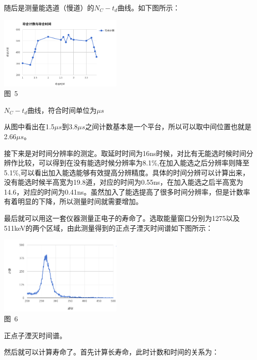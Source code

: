 \documentclass[a4paper,10.0pt,twoside]{npr}
\begin{document}
\begin{multicols}{2}
随后是测量能选道（慢道）的$N_C-t_d$曲线。如下图所示：

\begin{center}
   \includegraphics[width=0.45\textwidth]{5.png}
\\
\xiaowu\song 图~5\begin{minipage}[t]{75mm} \quad $N_C-t_d$曲线，符合时间单位为$\mu s$\\[-1mm]\wuhao
\end{minipage}
\end{center}

从图中看出在1.5$\mu s$到3.8$\mu s$之间计数基本是一个平台，所以可以取中间位置也就是2.66$\mu s$。

接下来是对时间分辨率的测定。取延时时间为16ns时候，对比有无能选时候时间分辨作比较，可以得到在没有能选时候分辨率为8.1\%,在加入能选之后分辨率则降至5.1\%,可以看出加入能选能够有效提高分辨精度。具体的时间分辨可以计算出来，没有能选时候半高宽为19.8道，对应的时间为0.55ns，在加入能选之后半高宽为14.6，对应的时间为0.41ns。虽然加入了能选提高了很多时间分辨率，但是计数率有着明显的下降，所以测量时间就需要增加。

最后就可以用这一套仪器测量正电子的寿命了。选取能量窗口分别为1275以及511keV的两个区域，由此测量得到的正点子湮灭时间谱如下图所示：

\begin{center}
   \includegraphics[width=0.45\textwidth]{6.png}
\\
\xiaowu\song 图~6\begin{minipage}[t]{75mm} \quad 正点子湮灭时间谱。\\[-1mm]\wuhao
\end{minipage}
\end{center}

然后就可以计算寿命了。首先计算长寿命，此时计数和时间的关系为：


\end{multicols}
\end{document}
